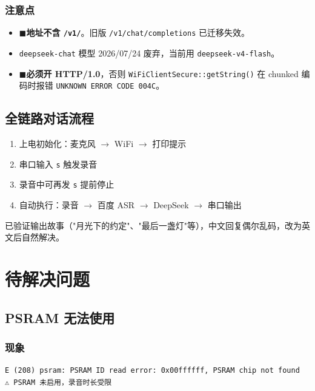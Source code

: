 \documentclass[12pt,a4paper,openany]{ctexbook}
\newcommand{\taskfail}{{\color{accent}$\blacksquare$}}
\begin{document}
\subsection*{注意点}
\begin{itemize}
    \item \taskfail \textbf{地址不含 \texttt{/v1/}}。旧版 \texttt{/v1/chat/completions} 已迁移失效。
    \item \texttt{deepseek-chat} 模型 2026/07/24 废弃，当前用 \texttt{deepseek-v4-flash}。
    \item \taskfail \textbf{必须开 HTTP/1.0}，否则 \texttt{WiFiClientSecure::getString()} 在 chunked 编码时报错 \texttt{UNKNOWN ERROR CODE 004C}。
\end{itemize}

\section{全链路对话流程}

\begin{enumerate}
    \item 上电初始化：麦克风 $\rightarrow$ WiFi $\rightarrow$ 打印提示
    \item 串口输入 \texttt{s} 触发录音
    \item 录音中可再发 \texttt{s} 提前停止
    \item 自动执行：录音 $\rightarrow$ 百度 ASR $\rightarrow$ DeepSeek $\rightarrow$ 串口输出
\end{enumerate}

已验证输出故事（"月光下的约定"、"最后一盏灯"等），中文回复偶尔乱码，改为英文后自然解决。

\chapter{待解决问题}

\section{PSRAM 无法使用}

\subsection*{现象}
\begin{verbatim}
E (208) psram: PSRAM ID read error: 0x00ffffff, PSRAM chip not found
⚠️ PSRAM 未启用，录音时长受限
\end{verbatim}
\end{document}
